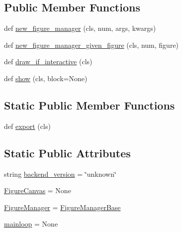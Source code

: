 \subsection*{Public Member Functions}
\begin{DoxyCompactItemize}
\item 
def \hyperlink{classmatplotlib_1_1backend__bases_1_1__Backend_ada76c5c0ae573c92df8fa7ad762016b0}{new\+\_\+figure\+\_\+manager} (cls, num, args, kwargs)
\item 
def \hyperlink{classmatplotlib_1_1backend__bases_1_1__Backend_a7ab40b936be9b0c112f9f4d64ed47872}{new\+\_\+figure\+\_\+manager\+\_\+given\+\_\+figure} (cls, num, figure)
\item 
def \hyperlink{classmatplotlib_1_1backend__bases_1_1__Backend_a93e52a9e83407914bdad9ade265eb807}{draw\+\_\+if\+\_\+interactive} (cls)
\item 
def \hyperlink{classmatplotlib_1_1backend__bases_1_1__Backend_a55cde99470e8d8f8f354b51640f28688}{show} (cls, block=None)
\end{DoxyCompactItemize}
\subsection*{Static Public Member Functions}
\begin{DoxyCompactItemize}
\item 
def \hyperlink{classmatplotlib_1_1backend__bases_1_1__Backend_a19794fc32649eefe7c895ecb6ce3c8d5}{export} (cls)
\end{DoxyCompactItemize}
\subsection*{Static Public Attributes}
\begin{DoxyCompactItemize}
\item 
string \hyperlink{classmatplotlib_1_1backend__bases_1_1__Backend_ac9e5a1ba0d4266f2df65022b1691c702}{backend\+\_\+version} = \char`\"{}unknown\char`\"{}
\item 
\hyperlink{classmatplotlib_1_1backend__bases_1_1__Backend_a8ff76ed5d10c2f98be1b2e3f6dc832c3}{Figure\+Canvas} = None
\item 
\hyperlink{classmatplotlib_1_1backend__bases_1_1__Backend_a6d6a3c7c73679e095343f66ddec802b2}{Figure\+Manager} = \hyperlink{classmatplotlib_1_1backend__bases_1_1FigureManagerBase}{Figure\+Manager\+Base}
\item 
\hyperlink{classmatplotlib_1_1backend__bases_1_1__Backend_a06fcee4482ec592c56699c1b8ecf729c}{mainloop} = None
\end{DoxyCompactItemize}


